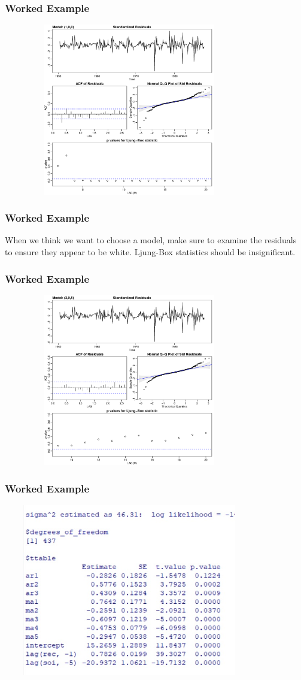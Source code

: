 \documentclass[%
xcolor=pdftex]{beamer}
\begin{document}
\begin{frame}
\frametitle{Worked Example}

\includegraphics[width=110mm, height=75mm]{diag1.pdf}

\end{frame}

\begin{frame}
\frametitle{Worked Example}

When we think we want to choose a model, make sure to examine the residuals to ensure they appear to be white. Ljung-Box statistics should be insignificant.

\end{frame}

\begin{frame}
\frametitle{Worked Example}

\includegraphics[width=110mm, height=75mm]{diag2.pdf}


\end{frame}

\begin{frame}
\frametitle{Worked Example}

\includegraphics[width=110mm, height=75mm]{lagreg.jpg}



\end{frame}
\end{document}
